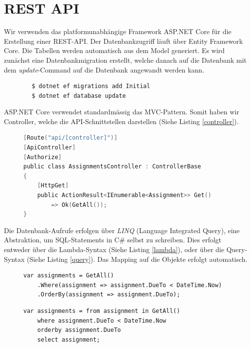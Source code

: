 \documentclass[a4paper, titlepage]{article}
\begin{document}
    \section{REST API}
    Wir verwenden das platformunabhängige Framework ASP.NET Core für die Erstellung einer REST-API.
    Der Datenbankzugriff läuft über Entity Framework Core. Die Tabellen werden automatisch aus dem Model
    generiert. Es wird zunächst eine Datenbankmigration erstellt, welche danach auf die Datenbank mit dem
    \emph{update}-Command auf die Datenbank angewandt werden kann.
    \begin{verbatim}
        $ dotnet ef migrations add Initial
        $ dotnet ef database update
    \end{verbatim}
    ASP.NET Core verwendet standardmässig das MVC-Pattern. Somit haben wir Controller, welche die API-Schnittstellen
    darstellen (Siehe Listing \ref{controller}).

    \begin{figure}
    \begin{lstlisting}[caption=Controller, label=controller, language=C]
[Route("api/[controller]")]
[ApiController]
[Authorize]
public class AssignmentsController : ControllerBase
{
    [HttpGet]
    public ActionResult<IEnumerable<Assignment>> Get()
        => Ok(GetAll());
}
    \end{lstlisting}
\end{figure}

    Die Datenbank-Aufrufe erfolgen über \emph{LINQ} (Language Integrated Query), eine Abstraktion, um
    SQL-Statements in C\# selbst zu schreiben. Dies erfolgt entweder über die Lambda-Syntax (Siehe Listing \ref{lambda}), oder über die Query-Syntax
    (Siehe Listing \ref{query}). Das Mapping auf die Objekte erfolgt automatisch.

    \begin{figure}
    \begin{lstlisting}[caption=Lambda-Syntax, label=lambda]
var assignments = GetAll()
    .Where(assignment => assignment.DueTo < DateTime.Now)
    .OrderBy(assignment => assignment.DueTo);
    \end{lstlisting}

    \begin{lstlisting}[caption=Query-Syntax, label=query]
var assignments = from assignment in GetAll()
    where assignment.DueTo < DateTime.Now
    orderby assignment.DueTo
    select assignment;
    \end{lstlisting}
\end{figure}
\end{document}
